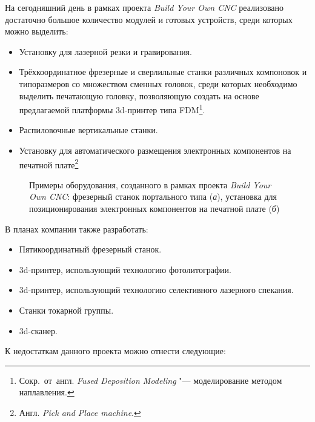 На сегодняшний день в рамках проекта \textit{Build Your Own CNC} реализовано достаточно большое количество модулей и готовых устройств, среди которых можно выделить:

\begin{itemize}
	\item Установку для лазерной резки и гравирования.
	\item Трёхкоординатное фрезерные и сверлильные станки различных компоновок и типоразмеров со множеством сменных головок, среди которых необходимо выделить печатающую головку, позволяющую создать на основе предлагаемой платформы 3d-принтер типа FDM\footnote{Сокр.~от~англ. \textit{Fused Deposition Modeling} "--- моделирование методом наплавления.}.
	\item Распиловочные вертикальные станки.
	\item Установку для автоматического размещения электронных компонентов на печатной плате\footnote{Англ. \textit{Pick and Place machine}.}
\end{itemize}

\begin{figure}[ht]
	\caption[Примеры оборудования, созданного в рамках проекта \textit{Build Your Own CNC}]%
	{Примеры оборудования, созданного в рамках проекта \textit{Build Your Own CNC}: фрезерный станок портального типа (\textit{а}), установка для позиционирования электронных компонентов на печатной плате (\textit{б})}\label{fig:byocnc}
\end{figure}

В планах компании также разработать:

\begin{itemize}
	\item Пятикоординатный фрезерный станок.	
	\item 3d-принтер, использующий технологию фотолитографии.
	\item 3d-принтер, использующий технологию селективного лазерного спекания.
	\item Станки токарной группы.
	\item 3d-сканер.
\end{itemize}

К недостаткам данного проекта можно отнести следующие:

